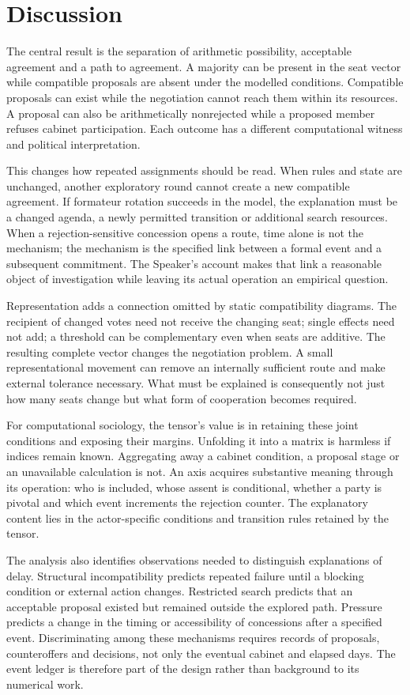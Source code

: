 \documentclass[11pt,a4paper]{article}
\begin{document}
\section{Discussion}

The central result is the separation of arithmetic possibility, acceptable agreement and a path to agreement. A majority can be present in the seat vector while compatible proposals are absent under the modelled conditions. Compatible proposals can exist while the negotiation cannot reach them within its resources. A proposal can also be arithmetically nonrejected while a proposed member refuses cabinet participation. Each outcome has a different computational witness and political interpretation.

This changes how repeated assignments should be read. When rules and state are unchanged, another exploratory round cannot create a new compatible agreement. If formateur rotation succeeds in the model, the explanation must be a changed agenda, a newly permitted transition or additional search resources. When a rejection-sensitive concession opens a route, time alone is not the mechanism; the mechanism is the specified link between a formal event and a subsequent commitment. The Speaker's account makes that link a reasonable object of investigation while leaving its actual operation an empirical question.

Representation adds a connection omitted by static compatibility diagrams. The recipient of changed votes need not receive the changing seat; single effects need not add; a threshold can be complementary even when seats are additive. The resulting complete vector changes the negotiation problem. A small representational movement can remove an internally sufficient route and make external tolerance necessary. What must be explained is consequently not just how many seats change but what form of cooperation becomes required.

For computational sociology, the tensor's value is in retaining these joint conditions and exposing their margins. Unfolding it into a matrix is harmless if indices remain known. Aggregating away a cabinet condition, a proposal stage or an unavailable calculation is not. An axis acquires substantive meaning through its operation: who is included, whose assent is conditional, whether a party is pivotal and which event increments the rejection counter. The explanatory content lies in the actor-specific conditions and transition rules retained by the tensor.

The analysis also identifies observations needed to distinguish explanations of delay. Structural incompatibility predicts repeated failure until a blocking condition or external action changes. Restricted search predicts that an acceptable proposal existed but remained outside the explored path. Pressure predicts a change in the timing or accessibility of concessions after a specified event. Discriminating among these mechanisms requires records of proposals, counteroffers and decisions, not only the eventual cabinet and elapsed days. The event ledger is therefore part of the design rather than background to its numerical work.
\end{document}
